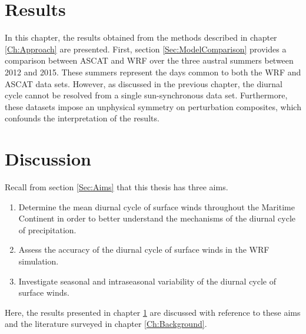 \documentclass[12pt]{book}
\begin{document}

\chapter{Results}
\label{Ch:Results}
In this chapter, the results obtained from the methods described in chapter \ref{Ch:Approach} are presented. First, section \ref{Sec:ModelComparison} provides a comparison between ASCAT and WRF over the three austral summers between 2012 and 2015. These summers represent the days common to both the WRF and ASCAT data sets. However, as discussed in the previous chapter, the diurnal cycle cannot be resolved from a single sun-synchronous data set. Furthermore, these datasets impose an unphysical symmetry on perturbation composites, which confounds the interpretation of the results.  


\chapter{Discussion}
\label{Ch:Discussion}

Recall from section \ref{Sec:Aims} that this thesis has three aims. 
\begin{enumerate}
\item
Determine the mean diurnal cycle of surface winds throughout the Maritime Continent in order to better understand the mechanisms of the diurnal cycle of precipitation. 
\item
Assess the accuracy of the diurnal cycle of surface winds in the \citet{vincent16b} WRF simulation.
\item
Investigate seasonal and intraseasonal variability of the diurnal cycle of surface winds.     
\end{enumerate}
Here, the results presented in chapter \ref{Ch:Results} are discussed with reference to these aims and the literature surveyed in chapter \ref{Ch:Background}.
\end{document}
